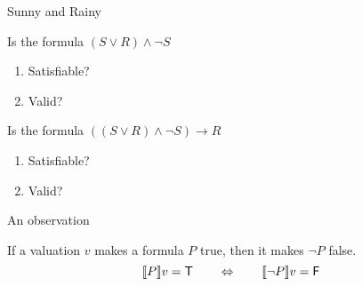 \documentclass[xetex,aspectratio=169,14pt,hyperref={pdfpagelabels=true,pdflang={en-GB}}]{beamer}
\begin{document}
\begin{frame}
  {Sunny and Rainy}

  \medskip

  Is the formula $(S \lor R) \land \lnot S$
  \begin{enumerate}
  \item Satisfiable? \\
    \quad {}
  \item Valid? \\
    \quad {}
  \end{enumerate}

  \bigskip
  \pause\pause\pause

  Is the formula $((S \lor R) \land \lnot S) \to R$
  \begin{enumerate}
  \item Satisfiable? \\
    \quad {}
  \item Valid? \\
    \quad {}
  \end{enumerate}

\end{frame}

\begin{frame}
  {An observation}

  If a valuation $v$ makes a formula $P$ true, then it makes $\lnot P$ false.
  \begin{displaymath}
    \llbracket P \rrbracket v = \mathsf{T} \qquad \Leftrightarrow \qquad \llbracket \lnot P \rrbracket v = \mathsf{F}
  \end{displaymath}

\end{frame}
\end{document}
